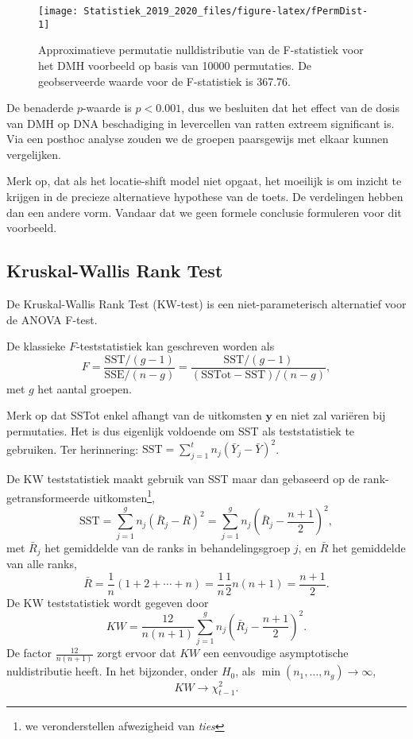 \documentclass[12pt,dutch,coursenotes]{book}
\let\rmarkdownfootnote\footnote%
\def\footnote{\protect\rmarkdownfootnote}
\theoremstyle{definition}
\theoremstyle{definition}
\theoremstyle{definition}
\theoremstyle{remark}
\begin{document}
\begin{figure}

{\centering \texttt{[image: Statistiek\_2019\_2020\_files/figure-latex/fPermDist-1]} 

}

\caption{Approximatieve permutatie nulldistributie van de F-statistiek voor het DMH voorbeeld op basis van 10000 permutaties. De geobserveerde waarde voor de F-statistiek is 367.76.}\label{fig:fPermDist}
\end{figure}

De benaderde \(p\)-waarde is \(p<0.001\), dus we besluiten dat het
effect van de dosis van DMH op DNA beschadiging in levercellen van
ratten extreem significant is. Via een posthoc analyse zouden we de
groepen paarsgewijs met elkaar kunnen vergelijken.

Merk op, dat als het locatie-shift model niet opgaat, het moeilijk is om
inzicht te krijgen in de precieze alternatieve hypothese van de toets.
De verdelingen hebben dan een andere vorm. Vandaar dat we geen formele
conclusie formuleren voor dit voorbeeld.

\subsection{Kruskal-Wallis Rank Test}\label{kruskal-wallis-rank-test}

De Kruskal-Wallis Rank Test (KW-test) is een niet-parameterisch
alternatief voor de ANOVA F-test.

De klassieke \(F\)-teststatistiek kan geschreven worden als \[
    F = \frac{\text{SST}/(g-1)}{\text{SSE}/(n-g)} = \frac{\text{SST}/(g-1)}{(\text{SSTot}-\text{SST})/(n-g)} ,
  \] met \(g\) het aantal groepen.

Merk op dat SSTot enkel afhangt van de uitkomsten \(\mathbf{y}\) en niet
zal variëren bij permutaties. Het is dus eigenlijk voldoende om SST als
teststatistiek te gebruiken. Ter herinnering:
\(\text{SST}=\sum_{j=1}^t n_j(\bar{Y}_j-\bar{Y})^2\).

De KW teststatistiek maakt gebruik van SST maar dan gebaseerd op de
rank-getransformeerde uitkomsten\footnote{we veronderstellen afwezigheid
  van \emph{ties}}, \[
     \text{SST} = \sum_{j=1}^g n_j \left(\bar{R}_j - \bar{R}\right)^2 = \sum_{j=1}^g n_j \left(\bar{R}_j - \frac{n+1}{2}\right)^2 ,
  \] met \(\bar{R}_j\) het gemiddelde van de ranks in behandelingsgroep
\(j\), en \(\bar{R}\) het gemiddelde van alle ranks, \[
    \bar{R} = \frac{1}{n}(1+2+\cdots + n) = \frac{1}{n}\frac{1}{2}n(n+1) = \frac{n+1}{2}.
  \] De KW teststatistiek wordt gegeven door \[
    KW = \frac{12}{n(n+1)}  \sum_{j=1}^g n_j \left(\bar{R}_j - \frac{n+1}{2}\right)^2.
  \] De factor \(\frac{12}{n(n+1)}\) zorgt ervoor dat \(KW\) een
eenvoudige asymptotische nuldistributie heeft. In het bijzonder, onder
\(H_0\), als \(\min(n_1,\ldots, n_g)\rightarrow \infty\), \[
    KW  \rightarrow \chi^2_{t-1}.
  \]
\end{document}
